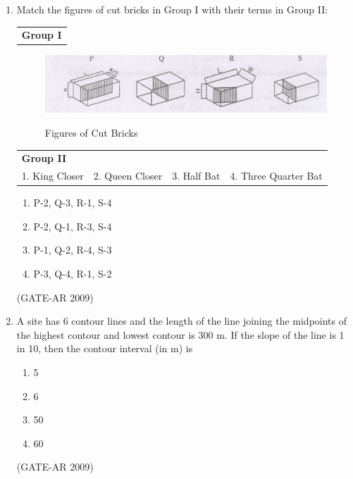 \documentclass[a4paper,10pt]{article}
\begin{document}
\begin{enumerate}
    \item Match the figures of cut bricks in Group I with their terms in Group II:  \\
    \begin{tabular}{ l }
	\textbf{Group I} \\
	\end{tabular}
	\begin{figure}[h]
        \centering
        \includegraphics[width=0.5\columnwidth]{figs/1.png}
        \label{fig:Img01}
	\caption{Figures of Cut Bricks}
	\end{figure}
    \begin{tabular}{ l l l l }
	\textbf{Group II} & & & \\
	1. King Closer & 2. Queen Closer & 3. Half Bat & 4. Three Quarter Bat \\
	\end{tabular}
	\begin{multicols}{2}
	\begin{enumerate}
        \item P-2, Q-3, R-1, S-4
        \item P-2, Q-1, R-3, S-4
        \item P-1, Q-2, R-4, S-3
        \item P-3, Q-4, R-1, S-2
    \end{enumerate}
	\end{multicols}
    \hfill (GATE-AR 2009)

    \item A site has 6 contour lines and the length of the line joining the midpoints of the highest contour and lowest contour is 300 m. If the slope of the line is 1 in 10, then the contour interval (in m) is 
    \begin{multicols}{4}
	\begin{enumerate}
        \item 5
        \item 6
        \item 50
        \item 60
    \end{enumerate}
	\end{multicols}
    \hfill (GATE-AR 2009)
	

\end{enumerate}
\end{document}

